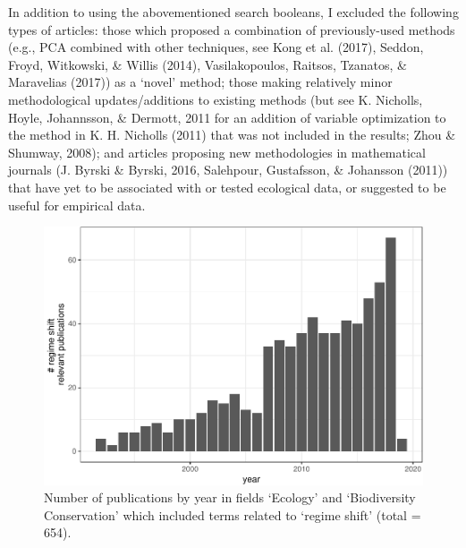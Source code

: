 \documentclass[12pt,twoside,openany]{reedthesis}
\begin{document}
In addition to using the abovementioned search booleans, I excluded the
following types of articles: those which proposed a combination of
previously-used methods (e.g., PCA combined with other techniques, see
Kong et al. (2017), Seddon, Froyd, Witkowski, \& Willis (2014),
Vasilakopoulos, Raitsos, Tzanatos, \& Maravelias (2017)) as a `novel'
method; those making relatively minor methodological updates/additions
to existing methods (but see K. Nicholls, Hoyle, Johannsson, \& Dermott,
2011 for an addition of variable optimization to the method in K. H.
Nicholls (2011) that was not included in the results; Zhou \& Shumway,
2008); and articles proposing new methodologies in mathematical journals
(J. Byrski \& Byrski, 2016, Salehpour, Gustafsson, \& Johansson (2011))
that have yet to be associated with or tested ecological data, or
suggested to be useful for empirical data.
\begin{figure}
\centering
\includegraphics{_myDissertation_files/figure-latex/wosRegimePubsByYear-1.pdf}
\caption{\label{fig:wosRegimePubsByYear}Number of publications by year in
fields `Ecology' and `Biodiversity Conservation' which included terms
related to `regime shift' (total = 654).}
\end{figure}
\end{document}
